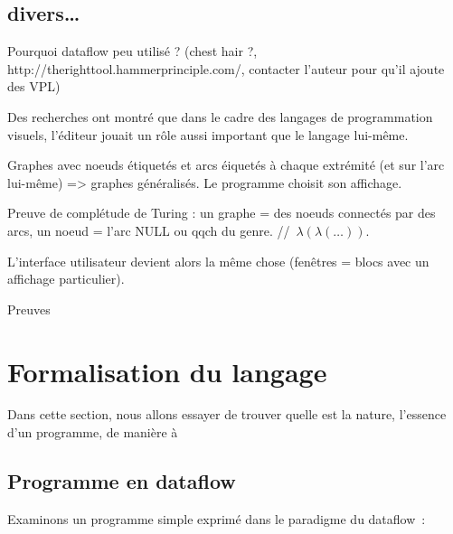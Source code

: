 \documentclass{article}
\begin{document}
\subsection{divers…}
Pourquoi dataflow peu utilisé ? (chest hair ?, http://therighttool.hammerprinciple.com/, contacter l'auteur pour qu'il ajoute des VPL)

Des recherches ont montré que dans le cadre des langages de programmation visuels, l'éditeur jouait un rôle aussi important que le langage
lui-même.

Graphes avec noeuds étiquetés et arcs éiquetés à chaque extrémité (et sur l'arc lui-même) => graphes généralisés.
Le programme choisit son affichage.

Preuve de complétude de Turing : un graphe = des noeuds connectés par des arcs, un noeud = l'arc NULL ou qqch du
genre. //~$\lambda(\lambda(\dots))$.

L'interface utilisateur devient alors la même chose (fenêtres = blocs avec un affichage particulier).

Preuves

\section{Formalisation du langage}

Dans cette section, nous allons essayer de trouver quelle est la nature, l'essence d'un programme, de manière à 

\subsection{Programme en dataflow}

Examinons un programme simple exprimé dans le paradigme du dataflow~:
\end{document}
